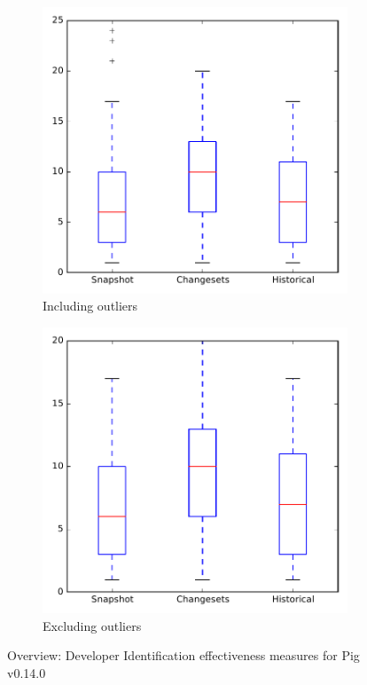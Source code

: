 
\begin{figure}
    \centering
    \begin{subfigure}{.4\textwidth}
        \centering
        \includegraphics[height=0.4\textheight]{figures/dit/all_pig}
        \caption{Including outliers}\label{fig:dit:all:pig_outlier}
    \end{subfigure}%
    \begin{subfigure}{.4\textwidth}
        \centering
        \includegraphics[height=0.4\textheight]{figures/dit/all_pig_no_outlier}
        \caption{Excluding outliers}\label{fig:dit:all:pig_no_outlier}
    \end{subfigure}
\caption{Overview: Developer Identification effectiveness measures for Pig v0.14.0}
\label{fig:dit:all:pig}
\end{figure}
